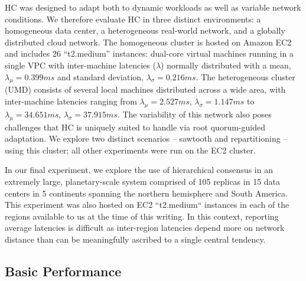 \documentclass[10pt,conference]{IEEEtran}
\begin{document}
HC was designed to adapt both to dynamic workloads as well as variable network
conditions.
We therefore evaluate HC in three distinct environments: a homogeneous data center, a
heterogeneous real-world network, and a globally distributed cloud network.
The homogeneous cluster is hosted on Amazon EC2 and includes 26 ``t2.medium'' instances:
dual-core virtual machines running in a single VPC with inter-machine latencies
($\lambda$) normally distributed with a mean, $\lambda_{\mu}=0.399ms$ and standard
deviation, $\lambda_{\sigma}=0.216ms$.
The heterogeneous cluster (UMD) consists of several local machines distributed across a
wide area, with inter-machine latencies ranging from
$\lambda_{\mu}=2.527ms$,
$\lambda_{\sigma}=1.147ms$ to $\lambda_{\mu}=34.651ms$,
$\lambda_{\sigma}=37.915ms$.
The variability of this network also poses challenges that HC is uniquely suited to
handle via root quorum-guided adaptation.
We explore two distinct scenarios -- sawtooth and repartitioning -- using this cluster;
all other experiments were run on the EC2 cluster.

In our final experiment, we explore the use of hierarchical consensus in an extremely
large, planetary-scale system comprised of 105 replicas in 15 data centers in 5
continents spanning the northern hemisphere and South America. This experiment was also
hosted on EC2 ``t2.medium`` instances in each of the regions available to us at the time
of this writing. In this context, reporting average latencies is difficult as
inter-region latencies depend more on network distance than can be meaningfully
ascribed to a single central tendency.

\subsection{Basic Performance}
\label{section:performance}
\end{document}
